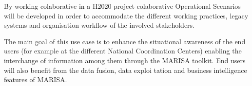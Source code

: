 By working colaborative in a H2020 project colaborative  
Operational Scenarios will be developed in order to accommodate the different working practices, legacy systems and organisation workflow of the involved stakeholders.

The main goal of this use case is to enhance the situational awareness of the end users (for example at the different National Coordination Centers) enabling the interchange of information among them through the MARISA toolkit.
End users will also benefit from the data fusion, data exploi tation and business intelligence features of MARISA.




